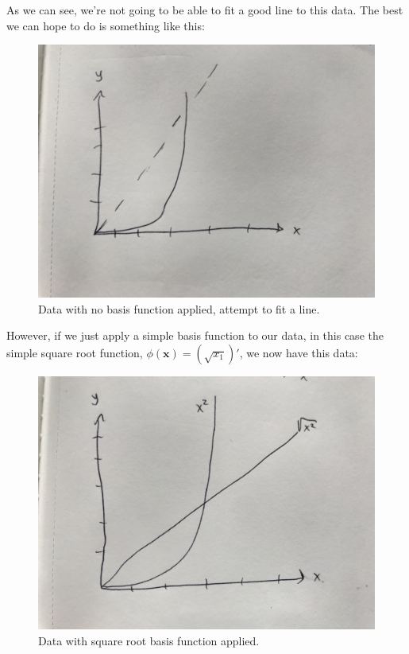 As we can see, we're not going to be able to fit a good line to this data. The best we can hope to do is something like this:

\begin{figure}[H]
    \centering
    \includegraphics[width=0.5\paperwidth]{../LinearRegression/fig/lin_reg_no_basis_fn_fitted.jpg}
    \caption{Data with no basis function applied, attempt to fit a line.}
    \label{fig:lin-reg-no-basis-fn-fitted}
\end{figure}

However, if we just apply a simple basis function to our data, in this case the simple square root function, $\phi(\textbf{x}) = (\sqrt{x_{1}})'$, we now have this data:

\begin{figure}[H]
    \centering
    \includegraphics[width=0.5\paperwidth]{../LinearRegression/fig/lin_reg_w_basis_fn.jpg}
    \caption{Data with square root basis function applied.}
    \label{fig:lin-reg-w-basis-fn-fitted}
\end{figure}

